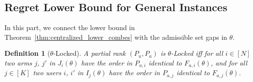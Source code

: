 \documentclass{article}
\newtheorem{definition}{Definition}
\begin{document}



\subsection{Regret Lower Bound for General Instances}
In this part, we connect the lower bound in Theorem~\ref{thm:centralized_lower_combes} with the admissible set gaps in $\theta$.
\begin{definition}[$\theta$-Locked] A partial rank $(P_u, P_a)$ is $\theta$-Locked \emph{iff} for all $i \in [N]$ two arms $j$, $j'$ in $J_i(\theta)$ have the order in $P_{u,i}$ identical to $F_{u,i}(\theta)$, and for all $j \in [K]$ two users $i$, $i'$  in $I_j(\theta)$ have the order in $P_{a,j}$ identical to $F_{a,j}(\theta)$.
\end{definition}


\end{document}
